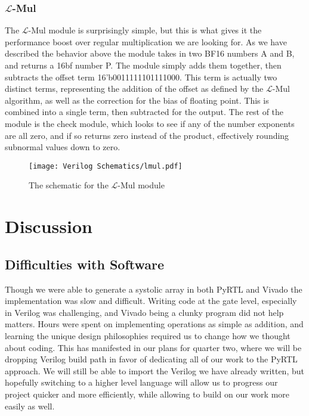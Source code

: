 \documentclass[12pt,letterpaper]{article}
\newcommand{\lmul}{$\mathcal{L}$-Mul\xspace}
\begin{document}
\subsubsection*{\lmul}

The \lmul module is surprisingly simple, but this is what gives it the performance boost over regular multiplication we are looking for.  As we have described the behavior above the module takes in two BF16 numbers A and B, and returns a 16bf number P.  The module simply adds them together, then subtracts the offset term 16'b0011111101111000.  This term is actually two distinct terms, representing the addition of the offset as defined by the \lmul algorithm, as well as the correction for the bias of floating point.  This is combined into a single term, then subtracted for the output.  The rest of the module is the check module, which looks to see if any of the number exponents are all zero, and if so returns zero instead of the product, effectively rounding subnormal values down to zero.

\begin{figure}[htbp]
    \centering
    \texttt{[image: Verilog Schematics/lmul.pdf]}
    \caption{The schematic for the \lmul module}
    \label{fig:lmul}
\end{figure}



\section{Discussion}

\subsection{Difficulties with Software}
Though we were able to generate a systolic array in both PyRTL and Vivado the implementation was slow and difficult.  Writing code at the gate level, especially in Verilog was challenging, and Vivado being a clunky program did not help matters.  Hours were spent on implementing operations as simple as addition, and learning the unique design philosophies required us to change how we thought about coding.  This has manifested in our plans for quarter two, where we will be dropping Verilog build path in favor of dedicating all of our work to the PyRTL approach.  We will still be able to import the Verilog we have already written, but hopefully switching to a higher level language will allow us to progress our project quicker and more efficiently, while allowing to build on our work more easily as well.
\end{document}
